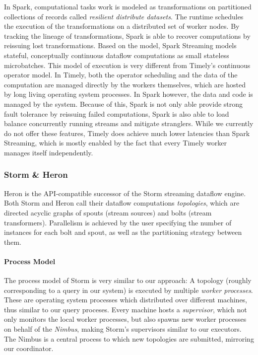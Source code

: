 In Spark, computational tasks work is modeled as transformations on partitioned
collections of records called \emph{resilient distribute datasets}. The
runtime schedules the execution of the transformations on a distributed set of
worker nodes. By tracking the lineage of transformations, Spark is able to
recover computations by reissuing lost transformations. Based on the model,
Spark Streaming models stateful, conceptually continuous dataflow computations
as small stateless microbatches. This model of execution is very different from
Timely's continuous operator model. In Timely, both the operator scheduling
and the data of the computation are managed directly by the workers themselves,
which are hosted by long living operating system processes. In Spark however,
the data and code is managed by the system. Because of this, Spark is not only
able provide strong fault tolerance by reissuing failed computations, Spark
is also able to load balance concurrently running streams and mitigate stranglers.
While we currently do not offer these features, Timely does achieve much lower
latencies than Spark Streaming, which is mostly enabled by the fact that every
Timely worker manages itself independently.


\subsubsection{Storm \& Heron}

Heron \cite{heron} is the API-compatible successor of the Storm \cite{storm}
streaming dataflow engine.
Both Storm and Heron call their dataflow computations \emph{topologies}, which 
are directed acyclic graphs of spouts (stream sources) and bolts
(stream transformers). Parallelism is achieved by the user specifying the
number of instances for each bolt and spout, as well as the partitioning
strategy between them.

\paragraph{Process Model}

The process model of Storm is very similar to our approach: A topology
(roughly corresponding to a query in our system) is executed by multiple
\emph{worker processes}. These are operating system processes which distributed
over different machines, thus similar to our query proceses. Every machine hosts
a \emph{supervisor}, which not only monitors the local worker processes, but also spawns new worker
processes on behalf of the \emph{Nimbus}, making Storm's supervisors similar to our executors.
The Nimbus is a central process to which new topologies are submitted, mirroring our coordinator.

